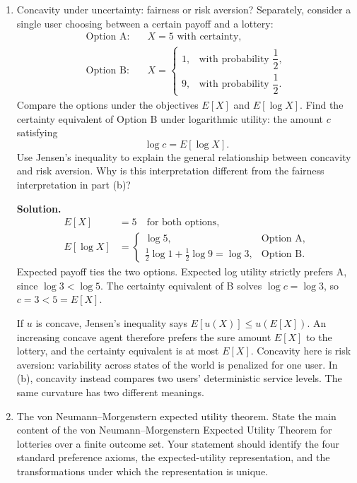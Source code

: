 \documentclass[11pt]{article}
\begin{document}
\begin{enumerate}[label=\arabic*., leftmargin=1.6em]
\begin{enumerate}
\item Concavity under uncertainty: fairness or risk aversion? Separately, consider a
single user choosing between a certain payoff and a lottery:
\begin{align*}
\text{Option A:} &\quad X=5 \text{ with certainty}, \\[0.4em]
\text{Option B:} &\quad
X=
\begin{cases}
1, & \text{with probability }\dfrac{1}{2}, \\[0.3em]
9, & \text{with probability }\dfrac{1}{2}.
\end{cases}
\end{align*}
Compare the options under the objectives $E[X]$ and $E[\log X]$. Find the certainty
equivalent of Option B under logarithmic utility: the amount $c$ satisfying
\[
\log c = E[\log X].
\]
Use Jensen's inequality to explain the general relationship between concavity and
risk aversion. Why is this interpretation different from the fairness interpretation
in part (b)?

\textbf{Solution.}
\begin{align*}
E[X]
&= 5
\quad\text{for both options}, \\
E[\log X]
&=
\begin{cases}
\log 5, & \text{Option A}, \\
\tfrac{1}{2}\log 1+\tfrac{1}{2}\log 9=\log 3, & \text{Option B}.
\end{cases}
\end{align*}
Expected payoff ties the two options. Expected log utility strictly prefers A, since \(\log 3<\log 5\). The certainty equivalent of B solves \(\log c=\log 3\), so \(c=3<5=E[X]\).

If \(u\) is concave, Jensen's inequality says \(E[u(X)]\le u(E[X])\). An increasing concave agent therefore prefers the sure amount \(E[X]\) to the lottery, and the certainty equivalent is at most \(E[X]\). Concavity here is risk aversion: variability across states of the world is penalized for one user. In (b), concavity instead compares two users' deterministic service levels. The same curvature has two different meanings.

\item The von Neumann--Morgenstern expected utility theorem. State the main content
of the von Neumann--Morgenstern Expected Utility Theorem for lotteries
over a finite outcome set. Your statement should identify the four standard
preference axioms, the expected-utility representation, and the transformations
under which the representation is unique.


\end{enumerate}
\end{enumerate}
\end{document}
